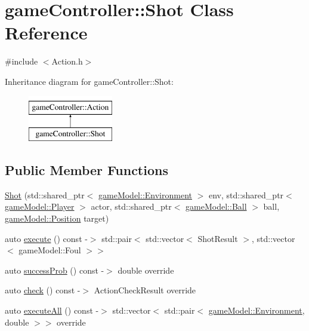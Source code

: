 \hypertarget{classgame_controller_1_1_shot}{\section{game\-Controller\-:\-:Shot Class Reference}
\label{classgame_controller_1_1_shot}
}


{\ttfamily \#include $<$Action.\-h$>$}

Inheritance diagram for game\-Controller\-:\-:Shot\-:\begin{figure}[H]
\begin{center}
\leavevmode
\includegraphics[height=2.000000cm]{classgame_controller_1_1_shot}
\end{center}
\end{figure}
\subsection*{Public Member Functions}
\begin{DoxyCompactItemize}
\item 
\hyperlink{classgame_controller_1_1_shot_a2bb5e375728dc141ef49a0f97dd36def}{Shot} (std\-::shared\-\_\-ptr$<$ \hyperlink{classgame_model_1_1_environment}{game\-Model\-::\-Environment} $>$ env, std\-::shared\-\_\-ptr$<$ \hyperlink{classgame_model_1_1_player}{game\-Model\-::\-Player} $>$ actor, std\-::shared\-\_\-ptr$<$ \hyperlink{classgame_model_1_1_ball}{game\-Model\-::\-Ball} $>$ ball, \hyperlink{structgame_model_1_1_position}{game\-Model\-::\-Position} target)
\item 
auto \hyperlink{classgame_controller_1_1_shot_a88b44fee398655bde62612376e7d2c3d}{execute} () const -\/$>$ std\-::pair$<$ std\-::vector$<$ Shot\-Result $>$, std\-::vector$<$ game\-Model\-::\-Foul $>$$>$
\item 
auto \hyperlink{classgame_controller_1_1_shot_a97b77844c8035c36d6dabfaadcdc0aa7}{success\-Prob} () const -\/$>$ double override
\item 
auto \hyperlink{classgame_controller_1_1_shot_abb3656ea14d64a07d2aef45e6410dfd8}{check} () const -\/$>$ Action\-Check\-Result override
\item 
auto \hyperlink{classgame_controller_1_1_shot_ae595cfcdfc6bb637860e98812df3db67}{execute\-All} () const -\/$>$ std\-::vector$<$ std\-::pair$<$ \hyperlink{classgame_model_1_1_environment}{game\-Model\-::\-Environment}, double $>$$>$ override
\end{DoxyCompactItemize}
